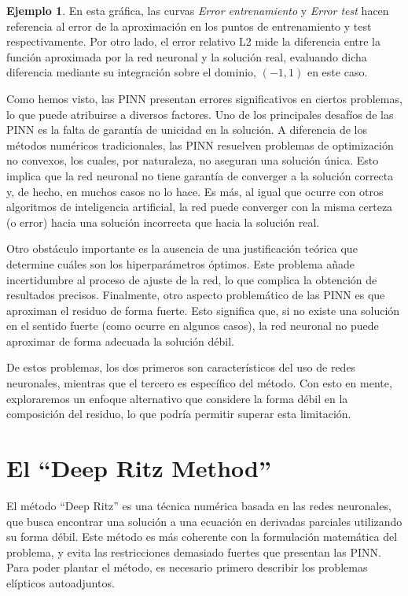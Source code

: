 \documentclass[a4paper,11pt,spanish, twoside, leqno]{tfg-uam}
\theoremstyle{definition}
\newtheorem{exmp}[teor]{Ejemplo}
\begin{document}
\begin{mdframed}
\begin{exmp}
        En esta gráfica, las curvas \textit{Error entrenamiento} y \textit{Error test} hacen referencia al error de la aproximación en los puntos de entrenamiento y test respectivamente. Por otro lado, el error relativo L2 mide la diferencia entre la función aproximada por la red neuronal y la solución real, evaluando dicha diferencia mediante su integración sobre el dominio, $(-1,1)$ en este caso.

    \end{exmp}
\end{mdframed}

Como hemos visto, las PINN presentan errores significativos en ciertos problemas, lo que puede atribuirse a diversos factores. Uno de los principales desafíos de las PINN es la falta de garantía de unicidad en la solución. A diferencia de los métodos numéricos tradicionales, las PINN resuelven problemas de optimización no convexos, los cuales, por naturaleza, no aseguran una solución única. Esto implica que la red neuronal no tiene garantía de converger a la solución correcta y, de hecho, en muchos casos no lo hace. Es más, al igual que ocurre con otros algoritmos de inteligencia artificial, la red puede converger con la misma certeza (o error) hacia una solución incorrecta que hacia la solución real.

Otro obstáculo importante es la ausencia de una justificación teórica que determine cuáles son los hiperparámetros óptimos. Este problema añade incertidumbre al proceso de ajuste de la red, lo que complica la obtención de resultados precisos. Finalmente, otro aspecto problemático de las PINN es que aproximan el residuo de forma fuerte. Esto significa que, si no existe una solución en el sentido fuerte (como ocurre en algunos casos), la red neuronal no puede aproximar de forma adecuada la solución débil.

De estos problemas, los dos primeros son característicos del uso de redes neuronales, mientras que el tercero es específico del método. Con esto en mente, exploraremos un enfoque alternativo que considere la forma débil en la composición del residuo, lo que podría permitir superar esta limitación.


\section{El ``Deep Ritz Method''} \label{sec:DeepRitz}

El método ``Deep Ritz'' es una técnica numérica basada en las redes neuronales, que busca encontrar una solución a una ecuación en derivadas parciales utilizando su forma débil. Este método es más coherente con la formulación matemática del problema, y evita las restricciones demasiado fuertes que presentan las PINN. Para poder plantar el método, es necesario primero describir los problemas elípticos autoadjuntos.
\end{document}

